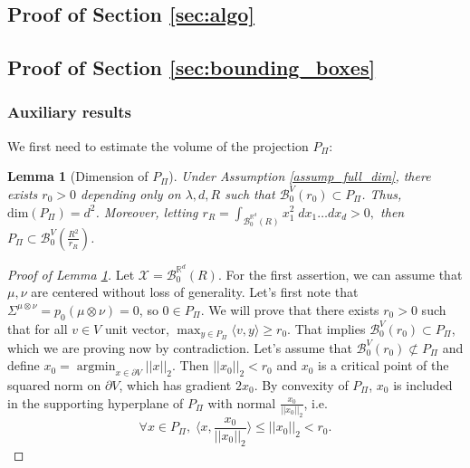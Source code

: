 \documentclass{article}
\newcommand{\R}{\mathbb{R}}
\newcommand{\X}{\mathcal{X}}
\newcommand{\B}{\mathcal{B}}
\newcommand{\1}{\mathbf{1}}
\DeclareMathOperator*{\argmin}{argmin}
\newtheorem{lemma}{Lemma}
\theoremstyle{definition}
\theoremstyle{remark}
\begin{document}
\begin{appendices}
\section{Proof of Section \ref{sec:algo}}\label{sec:supp_algo} 
\subsection{Proof of Section \ref{sec:bounding_boxes}}\label{sec:supp_algo_conv}

\subsubsection*{Auxiliary results} 



We first need to estimate the volume of the projection $P_\Pi$:
\begin{lemma}[Dimension of $P_\Pi$]\label{lemma:P_Pi_volume}
    Under Assumption \ref{assump_full_dim}, there exists $r_0>0$ depending only on $\lambda,d,R$ such that $\mathcal{B}^V_{0}\left(r_0\right)\subset P_\Pi$.  Thus, $\mathrm{dim}(P_\Pi)= d^2$. Moreover, letting 
    $r_R=\int_{\mathcal{B}^{\R^d}_0(R)}x_1^2\; dx_1\dots dx_d>0,$ 
    then $P_\Pi\subset\mathcal{B}^V_{0}(\frac{R^2}{r_R})$.
\end{lemma}
\begin{proof}[Proof of Lemma \ref{lemma:P_Pi_volume}] Let $\X= \B_0^{\R^d}(R)$. For the first assertion, we can assume that $\mu,\nu$ are centered without loss of generality. Let's  first note that $\Sigma^{\mu\otimes\nu}=p_0(\mu\otimes\nu)=0$, so $0\in P_\Pi$.
    We will prove that there exists $r_0>0$ such that for all $v\in V$ unit vector, $\max_{y\in P_\Pi}\langle v,y\rangle\geq r_0$. That implies $\mathcal{B}^V_{0}\left(r_0\right)\subset P_\Pi$, which we are proving now by contradiction. Let's assume that $\mathcal{B}^V_{0}\left(r_0\right)\not\subset P_\Pi$ and define $x_0=\argmin_{x\in \partial V}||x||_2$. Then $||x_0||_2<r_0$ and $x_0$ is a critical point of the squared norm on $\partial V$, which has gradient $2x_0$. By convexity of $P_\Pi$, $x_0$ is included in the supporting hyperplane of $P_\Pi$ with normal $\frac{x_0}{||x_0||_2}$, i.e. \[ \forall x\in P_\Pi,\; \langle x, \frac{x_0}{||x_0||_2}\rangle\leq||x_0||_2<r_0.\]
    

\end{proof}
\end{appendices}
\end{document}
